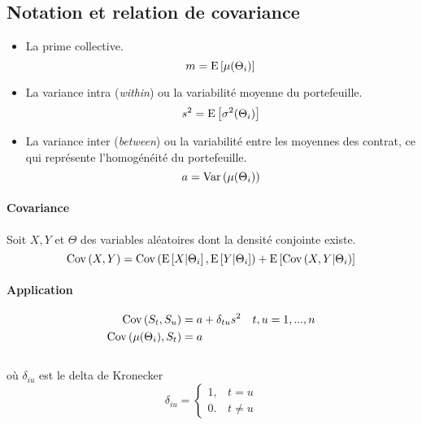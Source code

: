 \documentclass[10pt, french]{article}
\begin{document}
\begin{multicols*}{3}
\subsection*{Notation et relation de covariance}
\begin{itemize}
    \item La prime collective. \[ m = \mathrm{E} \left[ \mu(\Theta_i) \right] \]
    \item La variance intra (\emph{within}) ou la variabilité moyenne du portefeuille. \[ s^2 = \mathrm{E} \left[ \sigma^2(\Theta_i) \right] \]
    \item La variance inter (\emph{between}) ou la variabilité entre les moyennes des contrat, ce qui représente l'homogénéité du portefeuille. \[ a = \mathrm{Var} \left( \mu(\Theta_i) \right) \]
\end{itemize}
\paragraph*{Covariance}
Soit $X,Y$ et $\Theta$ des variables aléatoires dont la densité conjointe existe. \[ \mathrm{Cov} \left( X,Y \right) = \mathrm{Cov} \left( \mathrm{E} \left[ X|\Theta_i \right], \mathrm{E} \left[ Y|\Theta_i \right] \right) + \mathrm{E} \left[ \mathrm{Cov} \left( X,Y|\Theta_i \right) \right] \]

\paragraph*{Application}
\begin{align*}
    \mathrm{Cov} \left( S_t,S_u \right) &= a + \delta_{tu}s^2\quad t,u = 1,...,n  \\
    \mathrm{Cov} \left( \mu(\Theta_i),S_t \right) &= a
\end{align*} \\
où $\delta_{iu}$ est le delta de Kronecker 
\[ 
\delta_{iu} = 
\left\{
\begin{array}{lc}
    1, & t = u \\
    0. & t \neq u
\end{array}
\right. 
\]


\end{multicols*}
\end{document}
